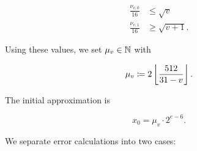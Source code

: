 \begin{align}
    \frac{\nu_{v,0}}{16} &\le \sqrt{v} \nonumber\\
    \frac{\nu_{v,1}}{16} &\ge \sqrt{v+1}.
    \label{eq:app_hyper4_v_bound}
\end{align}

\noindent
Using these values,
we set $\mu_{v}\in\mathbb{N}$ with

\begin{equation}
    \mu_{v} \coloneqq{} 2\left\lfloor \frac{512}{31-v} \right\rfloor.
\end{equation}

The initial approximation is

\begin{equation}
    x_{0} = \mu_{v}\cdot2^{e-6}.
\end{equation}

\noindent
We separate error calculations into two cases:

